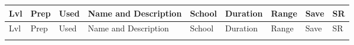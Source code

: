 \documentclass{rpgcharsheet2}
\begin{document}
\noindent\vspace{-15.5\unitlength}
\renewcommand*{\do}[1]{ %
\csname #1\endcsname
}
\setlength{\tabcolsep}{.1cm}
\centering
\begin{longtable}{@{}|>{\centering}p{.7cm}|>{\centering}p{.7cm}|>{\centering}p{.7cm}|p{6cm}|>{\centering}p{2cm}|>{\centering}p{2.6cm}|>{\centering}p{1.6cm}|>{\centering}p{1.5cm}|>{\centering\arraybackslash}p{1.3cm}|@{}}
\hline
Lvl &Prep&Used& Name and Description & School & Duration & Range & Save & SR\\\hline
\endfirsthead
\hline
Lvl &Prep&Used& Name and Description & School & Duration & Range & Save & SR\\\hline
\endhead
\endfoot
\endlastfoot
\dolistloop{\cantrips}
\dolistloop{\firstspells}
\dolistloop{\secondspells}
\dolistloop{\thirdspells}
\dolistloop{\fourthspells}
\dolistloop{\fifthspells}
\dolistloop{\sixthspells}
\dolistloop{\seventhspells}
\dolistloop{\eighthspells}
\dolistloop{\ninthspells}
\end{longtable}

\end{document}
